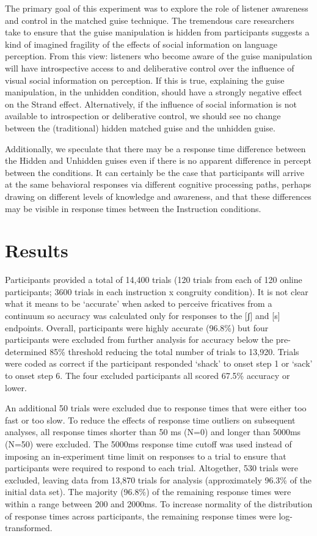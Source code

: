\documentclass[
  letterpaper,
  DIV=11,
  numbers=noendperiod]{scrartcl}
\begin{document}
The primary goal of this experiment was to explore the role of listener
awareness and control in the matched guise technique. The tremendous
care researchers take to ensure that the guise manipulation is hidden
from participants suggests a kind of imagined fragility of the effects
of social information on language perception. From this view: listeners
who become aware of the guise manipulation will have introspective
access to and deliberative control over the influence of visual social
information on perception. If this is true, explaining the guise
manipulation, in the unhidden condition, should have a strongly negative
effect on the Strand effect. Alternatively, if the influence of social
information is not available to introspection or deliberative control,
we should see no change between the (traditional) hidden matched guise
and the unhidden guise.

Additionally, we speculate that there may be a response time difference
between the Hidden and Unhidden guises even if there is no apparent
difference in percept between the conditions. It can certainly be the
case that participants will arrive at the same behavioral responses via
different cognitive processing paths, perhaps drawing on different
levels of knowledge and awareness, and that these differences may be
visible in response times between the Instruction conditions.

\section{Results}\label{sec-results}

Participants provided a total of 14,400 trials (120 trials from each of
120 online participants; 3600 trials in each instruction x congruity
condition). It is not clear what it means to be `accurate' when asked to
perceive fricatives from a continuum so accuracy was calculated only for
responses to the {[}ʃ{]} and {[}s{]} endpoints. Overall, participants
were highly accurate (96.8\%) but four participants were excluded from
further analysis for accuracy below the pre-determined 85\% threshold
reducing the total number of trials to 13,920. Trials were coded as
correct if the participant responded `shack' to onset step 1 or `sack'
to onset step 6. The four excluded participants all scored 67.5\%
accuracy or lower.

An additional 50 trials were excluded due to response times that were
either too fast or too slow. To reduce the effects of response time
outliers on subsequent analyses, all response times shorter than 50 ms
(N=0) and longer than 5000ms (N=50) were excluded. The 5000ms response
time cutoff was used instead of imposing an in-experiment time limit on
responses to a trial to ensure that participants were required to
respond to each trial. Altogether, 530 trials were excluded, leaving
data from 13,870 trials for analysis (approximately 96.3\% of the
initial data set). The majority (96.8\%) of the remaining response times
were within a range between 200 and 2000ms. To increase normality of the
distribution of response times across participants, the remaining
response times were log-transformed.
\end{document}
